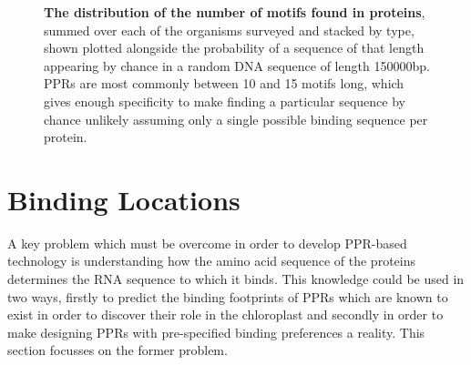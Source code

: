 \begin{figure}
  \begin{center}
    \caption{
      \textbf{The distribution of the number of motifs found in proteins}, 
      summed over each of the organisms surveyed and stacked by type, shown
      plotted alongside the probability of a sequence of that length appearing
      by chance in a random DNA sequence of length 150000bp.
      PPRs are most commonly between 10 and 15 motifs long, which gives enough
      specificity to make finding a particular sequence by chance unlikely
      assuming only a single possible binding sequence per protein.
      \label{fig:ppr_family_lengths}}
  \end{center}
\end{figure}

\section{Binding Locations}

A key problem which must be overcome in order to develop PPR-based technology
is understanding how the amino acid sequence of the proteins determines the RNA
sequence to which it binds.
This knowledge could be used in two ways, firstly to predict the binding
footprints of PPRs which are known to exist in order to discover their role in
the chloroplast and secondly in order to make designing PPRs with pre-specified
binding preferences a reality.
This section focusses on the former problem.

